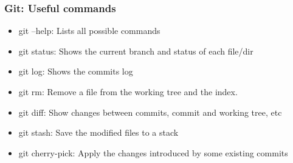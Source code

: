\begin{frame}

\frametitle{Git: Useful commands}

\begin{multicols}{2}

\begin{itemize}
\item git --help: Lists all possible commands
\item git status: Shows the current branch and status of each file/dir
\item git log: Shows the commits log
\item git rm: Remove a file from the working tree and the index.
\columnbreak
\item git diff: Show changes between commits, commit and working tree, etc
\item git stash: Save the modified files to a stack
\item git cherry-pick: Apply the changes introduced by some existing commits

\end{itemize}
\end{multicols}


\end{frame}